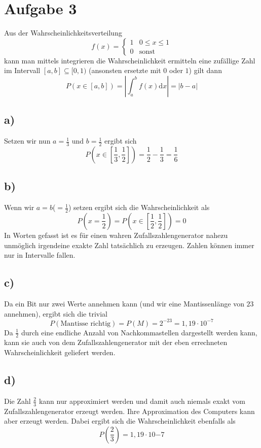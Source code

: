 \section{Aufgabe 3}
\label{sec:Aufgabe3}
Aus der Wahrscheinlichkeitsverteilung
\begin{equation}
  f(x)=
  \begin{cases}
    1   & 0\leq x \leq 1\\
    0   &\text{sonst}
  \end{cases}
\end{equation}
kann man mittels integrieren die Wahrscheinlichkeit ermitteln eine zufällige Zahl
im Intervall $[a,b]\subseteq [0,1)$ (ansonsten ersetzte mit $0$ oder $1$) gilt dann
\begin{equation}
  P(x\in [ a,b ])=\left|\int_a^b f(x)\text{d}x\right|=|b-a|
\end{equation}
\subsection{a)}
Setzen wir nun $a=\frac{1}{3}$ und $b=\frac{1}{2}$ ergibt sich
\begin{equation}
  P\left(x\in \left[\frac{1}{3},\frac{1}{2}\right]\right)=\frac{1}{2}-\frac{1}{3}=\frac{1}{6}
\end{equation}

\subsection{b)}
Wenn wir $a=b$($=\frac{1}{2}$) setzen ergibt sich die Wahrscheinlichkeit als
\begin{equation}
  P\left(x=\frac{1}{2}\right)=P\left(x\in \left[\frac{1}{2},\frac{1}{2}\right]\right)=0
\end{equation}
In Worten gefasst ist es für einen wahren Zufallszahlengenerator nahezu unmöglich irgendeine exakte Zahl tatsächlich zu erzeugen. Zahlen können immer nur in Intervalle fallen.

\subsection{c)}
Da ein Bit nur zwei Werte annehmen kann (und wir eine Mantissenlänge von $23$ annehmen), ergibt sich die trivial
\begin{equation}
  P(\text{Mantisse richtig})=P(M)=2^{-23}=1,19\cdot10^{-7}
\end{equation}
Da $\frac{1}{2}$ durch eine endliche Anzahl von Nachkommastellen dargestellt werden kann, kann sie auch von dem Zufallszahlengenerator mit der eben errechneten Wahrscheinlichkeit geliefert werden.

\subsection{d)}
Die Zahl $\frac{2}{3}$ kann nur approximiert werden und damit auch niemals exakt vom Zufallszahlengenerator erzeugt werden. Ihre Approximation des Computers kann aber erzeugt werden. Dabei ergibt sich die Wahrscheinlichkeit ebenfalls als
\begin{equation}
  P\left(\frac{2}{3}\right)=1,19\cdot10{-7}
\end{equation}
